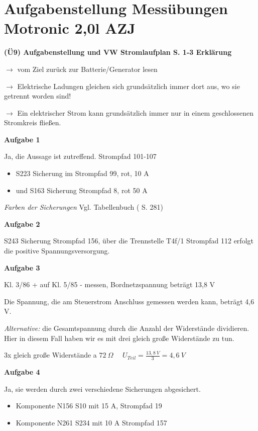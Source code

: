 \section{Aufgabenstellung Messübungen Motronic 2,0l
AZJ}\label{aufgabenstellung-messuebungen-motronic-20l-azj}

\textbf{(Ü9) Aufgabenstellung und VW Stromlaufplan S. 1-3 Erklärung}

$\to$ vom Ziel zurück zur Batterie/Generator lesen

$\to$ Elektrische Ladungen gleichen sich grundsätzlich immer dort aus,
wo sie getrennt worden sind!

$\to$ Ein elektrischer Strom kann grundsätzlich immer nur in einem
geschlossenen Stromkreis fließen.

\textbf{Aufgabe 1}

Ja, die Aussage ist zutreffend. Strompfad 101-107

\begin{itemize}
\item
  S223 Sicherung im Strompfad 99, rot, 10 A
\item
  und S163 Sicherung Strompfad 8, rot 50 A
\end{itemize}

\emph{Farben der Sicherungen} Vgl. Tabellenbuch
(\textcite{bell:2021:tabellenbuchKfz} S. 281)

\textbf{Aufgabe 2}

S243 Sicherung Strompfad 156, über die Trennstelle T4f/1 Strompfad 112
erfolgt die positive Spannungsversorgung.

\textbf{Aufgabe 3}

Kl. 3/86 + auf Kl. 5/85 - messen, Bordnetzspannung beträgt 13,8 V

Die Spannung, die am Steuerstrom Anschluss gemessen werden kann, beträgt
4,6 V.

\emph{Alternative:} die Gesamtspannung durch die Anzahl der Widerstände
dividieren. Hier in diesem Fall haben wir es mit drei gleich große
Widerstände zu tun.

3x gleich große Widerstände a $72~\Omega \quad$
$U_{Teil} = \frac{13,8~V}{3} = 4,6~V$

\textbf{Aufgabe 4}

Ja, sie werden durch zwei verschiedene Sicherungen abgesichert.

\begin{itemize}
\item
  Komponente N156 S10 mit 15 A, Strompfad 19
\item
  Komponente N261 S234 mit 10 A Strompfad 157
\end{itemize}

